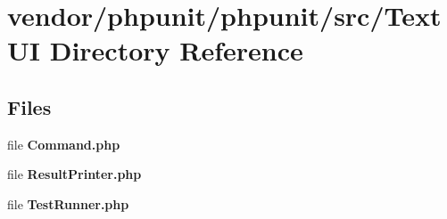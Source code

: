 \section{vendor/phpunit/phpunit/src/\+Text\+U\+I Directory Reference}
\label{dir_9bcc6d89c345da5e0a690cf4122f072d}
\subsection*{Files}
\begin{DoxyCompactItemize}
\item 
file {\bf Command.\+php}
\item 
file {\bf Result\+Printer.\+php}
\item 
file {\bf Test\+Runner.\+php}
\end{DoxyCompactItemize}
